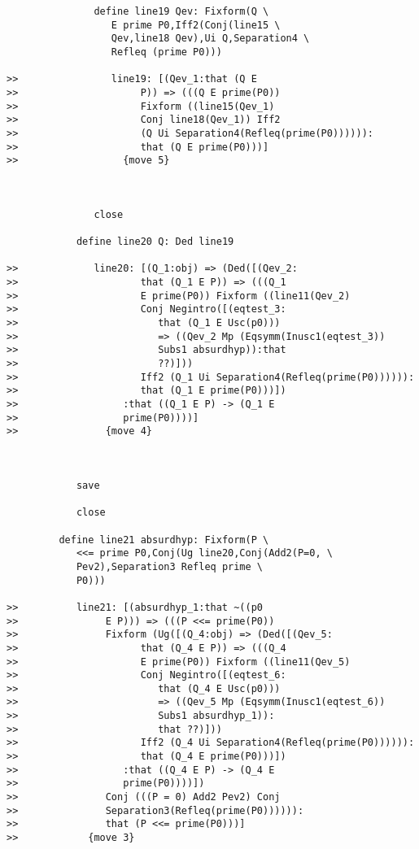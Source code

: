 \documentclass[12pt]{article}
\begin{document}
\begin{verbatim}
               define line19 Qev: Fixform(Q \
                  E prime P0,Iff2(Conj(line15 \
                  Qev,line18 Qev),Ui Q,Separation4 \
                  Refleq (prime P0)))

>>                line19: [(Qev_1:that (Q E
>>                     P)) => (((Q E prime(P0))
>>                     Fixform ((line15(Qev_1)
>>                     Conj line18(Qev_1)) Iff2
>>                     (Q Ui Separation4(Refleq(prime(P0)))))):
>>                     that (Q E prime(P0)))]
>>                  {move 5}



               close

            define line20 Q: Ded line19

>>             line20: [(Q_1:obj) => (Ded([(Qev_2:
>>                     that (Q_1 E P)) => (((Q_1
>>                     E prime(P0)) Fixform ((line11(Qev_2)
>>                     Conj Negintro([(eqtest_3:
>>                        that (Q_1 E Usc(p0)))
>>                        => ((Qev_2 Mp (Eqsymm(Inusc1(eqtest_3))
>>                        Subs1 absurdhyp)):that
>>                        ??)]))
>>                     Iff2 (Q_1 Ui Separation4(Refleq(prime(P0)))))):
>>                     that (Q_1 E prime(P0)))])
>>                  :that ((Q_1 E P) -> (Q_1 E
>>                  prime(P0))))]
>>               {move 4}



            save

            close

         define line21 absurdhyp: Fixform(P \
            <<= prime P0,Conj(Ug line20,Conj(Add2(P=0, \
            Pev2),Separation3 Refleq prime \
            P0)))

>>          line21: [(absurdhyp_1:that ~((p0
>>               E P))) => (((P <<= prime(P0))
>>               Fixform (Ug([(Q_4:obj) => (Ded([(Qev_5:
>>                     that (Q_4 E P)) => (((Q_4
>>                     E prime(P0)) Fixform ((line11(Qev_5)
>>                     Conj Negintro([(eqtest_6:
>>                        that (Q_4 E Usc(p0)))
>>                        => ((Qev_5 Mp (Eqsymm(Inusc1(eqtest_6))
>>                        Subs1 absurdhyp_1)):
>>                        that ??)]))
>>                     Iff2 (Q_4 Ui Separation4(Refleq(prime(P0)))))):
>>                     that (Q_4 E prime(P0)))])
>>                  :that ((Q_4 E P) -> (Q_4 E
>>                  prime(P0))))])
>>               Conj (((P = 0) Add2 Pev2) Conj
>>               Separation3(Refleq(prime(P0)))))):
>>               that (P <<= prime(P0)))]
>>            {move 3}




\end{verbatim}
\end{document}
